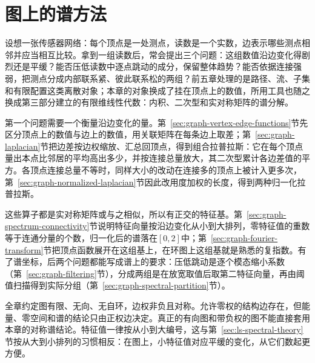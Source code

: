 \chapter{图上的谱方法}
\label{chap:graph-spectral}

设想一张传感器网络：每个顶点是一处测点，读数是一个实数，边表示哪些测点相邻并应当相互比较。拿到一组读数后，常会提出三个问题：这组数值沿边变化得剧烈还是平缓？能否压低读数中逐点跳动的成分，保留整体趋势？能否依据连接强弱，把测点分成内部联系紧、彼此联系松的两组？前五章处理的是路径、流、子集和有限配置这类离散对象；本章的对象换成了挂在顶点上的数值，所用工具也随之换成第三部分建立的有限维线性代数：内积、二次型和实对称矩阵的谱分解。

第一个问题需要一个衡量沿边变化的量。第~\ref{sec:graph-vertex-edge-functions}节先区分顶点上的数值与边上的数值，用关联矩阵在每条边上取差；第~\ref{sec:graph-laplacian}节把边差按边权缩放、汇总回顶点，得到组合拉普拉斯：它在每个顶点量出本点比邻居的平均高出多少，并按连接总量放大，其二次型累计各边差值的平方。各顶点连接总量不等时，同样大小的改动在连接多的顶点上被计入更多次，第~\ref{sec:graph-normalized-laplacian}节因此改用度加权的长度，得到两种归一化拉普拉斯。

这些算子都是实对称矩阵或与之相似，所以有正交的特征基。第~\ref{sec:graph-spectrum-connectivity}节说明特征向量按沿边变化从小到大排列，零特征值的重数等于连通分量的个数，归一化后的谱落在$[0,2]$中；第~\ref{sec:graph-fourier-transform}节把顶点函数展开在这组基上，在环图上这组基就是熟悉的复指数。有了谱坐标，后两个问题都能写成谱上的要求：压低跳动是逐个模态缩小系数（第~\ref{sec:graph-filtering}节），分成两组是在放宽取值后取第二特征向量，再由阈值扫描得到实际分组（第~\ref{sec:graph-spectral-partition}节）。

全章约定图有限、无向、无自环，边权非负且对称。允许零权的结构边存在，但能量、零空间和谱的结论只由正权边决定。真正的有向图和带负权的图不能直接套用本章的对称谱结论。特征值一律按从小到大编号，这与第~\ref{sec:ls-spectral-theory}节按从大到小排列的习惯相反：在图上，小特征值对应平缓的变化，从它们数起更方便。









